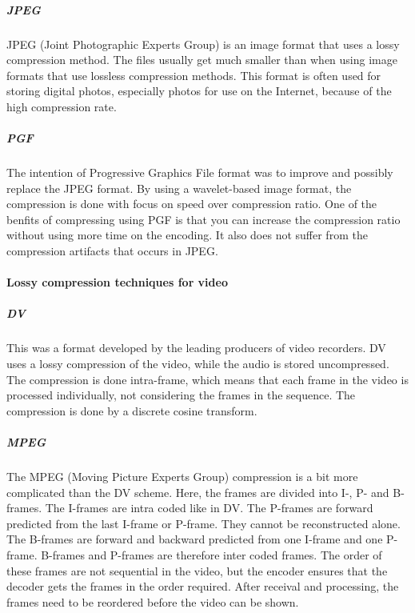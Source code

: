 \subparagraph{JPEG} \hfill
\newline
JPEG (Joint Photographic Experts Group) is an image format that uses a lossy compression method. The files usually get much smaller than when using image formats that use lossless compression methods. This format is often used for storing digital photos, especially photos for use on the Internet, because of the high compression rate. \cite{bib:JPEG}


\subparagraph{PGF} \hfill
\newline
The intention of Progressive Graphics File format was to improve and possibly replace the JPEG format. By using a wavelet-based image format, the compression is done with focus on speed over compression ratio. One of the benfits of compressing using PGF is that you can increase the compression ratio without using more time on the encoding. It also does not suffer from the compression artifacts that occurs in JPEG.
\cite{bib:PGF}

\paragraph{Lossy compression techniques for video}

\subparagraph{DV} \hfill
\newline
This was a format developed by the leading producers of video recorders. DV uses a lossy compression of the video, while the audio is stored uncompressed. The compression is done intra-frame, which means that each frame in the video is processed individually, not considering the frames in the sequence. The compression is done by a discrete cosine transform.
\cite{bib:DV}

\pagebreak

\subparagraph{MPEG} \hfill
\newline
The MPEG (Moving Picture Experts Group) compression is a bit more complicated than the DV scheme. Here, the frames are divided into I-, P- and B-frames. The I-frames are intra coded like in DV. The P-frames are forward predicted from the last I-frame or P-frame. They cannot be reconstructed alone. The B-frames are forward and backward predicted from one I-frame and one P-frame. B-frames and P-frames are therefore inter coded frames. The order of these frames are not sequential in the video, but the encoder ensures that the decoder gets the frames in the order required. After receival and processing, the frames need to be reordered before the video can be shown.
\cite{bib:MPEG}



